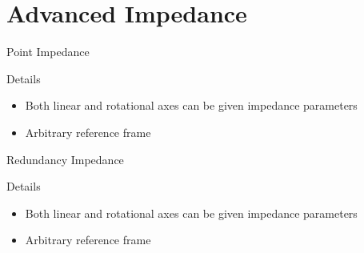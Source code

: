 \documentclass{beamer}
\begin{document}
\section{Advanced Impedance}

\begin{frame}[fragile]{Point Impedance}

  \begin{block}{Details}
    \begin{itemize}
      \item Both linear and rotational axes can be given impedance parameters
      \item Arbitrary reference frame
    \end{itemize}
  \end{block}
\end{frame}

\begin{frame}[fragile]{Redundancy Impedance}

  \begin{block}{Details}
    \begin{itemize}
      \item Both linear and rotational axes can be given impedance parameters
      \item Arbitrary reference frame
    \end{itemize}
  \end{block}
\end{frame}
\end{document}
